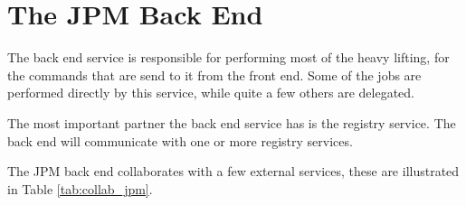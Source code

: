 \section{The JPM Back End}

The back end service is responsible for performing most of the heavy lifting,
for the commands that are send to it from the front end. Some of the jobs
are performed directly by this service, while quite a few others are
delegated.

The most important partner the back end service has is the registry service.
The back end will communicate with one or more registry services.

The JPM back end collaborates with a few external services, these are
illustrated in Table \ref{tab:collab_jpm}.

\begin{table}[H]
\centering



\end{table}

